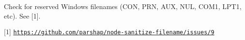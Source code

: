 Check for reserved Windows filenames ({\ttfamily C\+ON}, {\ttfamily P\+RN}, {\ttfamily A\+UX}, {\ttfamily N\+UL}, {\ttfamily C\+O\+M1}, {\ttfamily L\+P\+T1}, etc). See \mbox{[}1\mbox{]}.

\mbox{[}1\mbox{]} \href{https://github.com/parshap/node-sanitize-filename/issues/9}{\tt https\+://github.\+com/parshap/node-\/sanitize-\/filename/issues/9} 